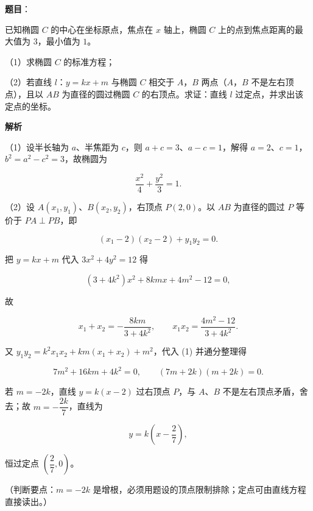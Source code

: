 \begin{answer}

\textbf{题目}：

已知椭圆 $C$ 的中心在坐标原点，焦点在 $x$ 轴上，椭圆 $C$ 上的点到焦点距离的最大值为 $3$，最小值为 $1$。

（1）求椭圆 $C$ 的标准方程；

（2）若直线 $l$：$y=kx+m$ 与椭圆 $C$ 相交于 $A$，$B$ 两点（$A$，$B$ 不是左右顶点），且以 $AB$ 为直径的圆过椭圆 $C$ 的右顶点。求证：直线 $l$ 过定点，并求出该定点的坐标。

\textbf{解析}

（1）设半长轴为 $a$、半焦距为 $c$，则 $a+c=3$、$a-c=1$，解得 $a=2$、$c=1$，$b^2=a^2-c^2=3$，故椭圆为

\nopagebreak[4]
\[\frac{x^2}{4}+\frac{y^2}{3}=1.\]

（2）设 $A(x_1,y_1)$、$B(x_2,y_2)$，右顶点 $P(2,0)$。以 $AB$ 为直径的圆过 $P$ 等价于 $PA\perp PB$，即

\nopagebreak[4]
\[(x_1-2)(x_2-2)+y_1y_2=0. \tag{1}\]

把 $y=kx+m$ 代入 $3x^2+4y^2=12$ 得

\nopagebreak[4]
\[(3+4k^2)x^2+8kmx+4m^2-12=0,\]

故

\nopagebreak[4]
\[x_1+x_2=-\frac{8km}{3+4k^2},\qquad x_1x_2=\frac{4m^2-12}{3+4k^2}.\]

又 $y_1y_2=k^2x_1x_2+km(x_1+x_2)+m^2$，代入 (1) 并通分整理得

\nopagebreak[4]
\[7m^2+16km+4k^2=0,\qquad (7m+2k)(m+2k)=0.\]

若 $m=-2k$，直线 $y=k(x-2)$ 过右顶点 $P$，与 $A$、$B$ 不是左右顶点矛盾，舍去；故 $m=-\dfrac{2k}{7}$，直线为

\nopagebreak[4]
\[y=k\left(x-\frac27\right),\]

恒过定点 $\left(\dfrac27,0\right)$。

（判断要点：$m=-2k$ 是增根，必须用题设的顶点限制排除；定点可由直线方程直接读出。）


\end{answer}